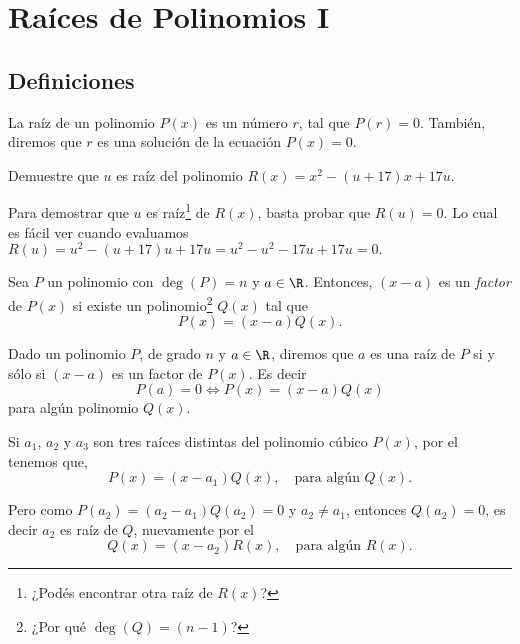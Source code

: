 \newpage
\section{Raíces de Polinomios I}

\subsection{Definiciones}

\begin{section-definition.tcb}
    La raíz de un polinomio $P(x)$ es un número $r$, tal que $P(r) = 0$.
    También, diremos que $r$ es una solución de la ecuación $P(x) = 0$.
\end{section-definition.tcb}

\begin{section-example.tcb}
    Demuestre que $u$ es raíz del polinomio $R(x) = x^2 - (u + 17) x + 17u$.
\end{section-example.tcb}
\begin{solution}
    Para demostrar que $u$ es raíz\footnote{¿Podés encontrar otra raíz de $R(x)$?} de $R(x)$, basta probar que $R(u) = 0$.
    Lo cual es fácil ver cuando evaluamos $R(u) = u^2 - (u+17)u + 17u = u^2 - u^2 - 17u + 17u = 0.$
\end{solution}

\begin{section-definition.tcb}
    Sea $P$ un polinomio con $\deg{(P)} = n$ y $a \in \R$.
    Entonces, $(x - a)$ es un \emph{factor} de $P(x)$ si existe un polinomio\footnote{¿Por qué $\deg{(Q)} = (n - 1)$?} $Q(x)$ tal que
    \[
        P(x) = (x-a)Q(x).
    \]
\end{section-definition.tcb}

\begin{section-theorem.tcb}\label{factor-theorem}
    Dado un polinomio $P$, de grado $n$ y $a \in \R$, diremos que $a$ es una raíz de $P$ si y sólo si $(x-a)$ es un factor de $P(x)$.
    Es decir
    \[
        P(a) = 0 \Leftrightarrow P(x) = (x - a)Q(x)
    \]
    para algún polinomio $Q(x).$
\end{section-theorem.tcb}

Si $a_1$, $a_2$ y $a_3$ son tres raíces distintas del polinomio cúbico $P(x)$, por el  tenemos que,
\[
    P(x) = (x - a_1)Q(x),\quad \text{para algún $Q(x)$}.
\]

Pero como $P(a_2) = (a_2 - a_1)Q(a_2) = 0$ y $a_2 \neq a_1$, entonces $Q(a_2) = 0$, es decir $a_2$ es raíz de $Q$, nuevamente por el 
\[
    Q(x) = (x - a_2)R(x),\quad \text{para algún $R(x)$}.
\]

